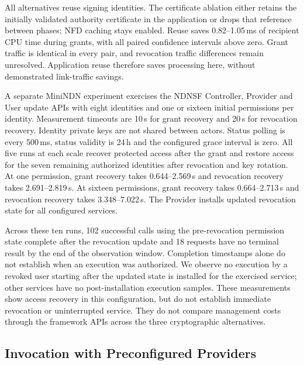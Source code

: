 All alternatives reuse signing identities. The certificate ablation either retains the initially validated authority certificate in the application or drops that reference between phases; NFD caching stays enabled. Reuse saves 0.82--1.05\,ms of recipient CPU time during grants, with all paired confidence intervals above zero. Grant traffic is identical in every pair, and revocation traffic differences remain unresolved. Application reuse therefore saves processing here, without demonstrated link-traffic savings.

A separate MiniNDN experiment exercises the NDNSF Controller, Provider and User update APIs with eight identities and one or sixteen initial permissions per identity. Measurement timeouts are 10\,s for grant recovery and 20\,s for revocation recovery. Identity private keys are not shared between actors. Status polling is every 500\,ms, status validity is 24\,h and the configured grace interval is zero. All five runs at each scale recover protected access after the grant and restore access for the seven remaining authorized identities after revocation and key rotation. At one permission, grant recovery takes 0.644--2.569\,s and revocation recovery takes 2.691--2.819\,s. At sixteen permissions, grant recovery takes 0.664--2.713\,s and revocation recovery takes 3.348--7.022\,s. The Provider installs updated revocation state for all configured services.

Across these ten runs, 102 successful calls using the pre-revocation permission state complete after the revocation update and 18 requests have no terminal result by the end of the observation window. Completion timestamps alone do not establish when an execution was authorized. We observe no execution by a revoked user starting after the updated state is installed for the exercised service; other services have no post-installation execution samples. These measurements show access recovery in this configuration, but do not establish immediate revocation or uninterrupted service. They do not compare management costs through the framework APIs across the three cryptographic alternatives.

\subsection{Invocation with Preconfigured Providers}
\label{sec:matched-provider-availability}

